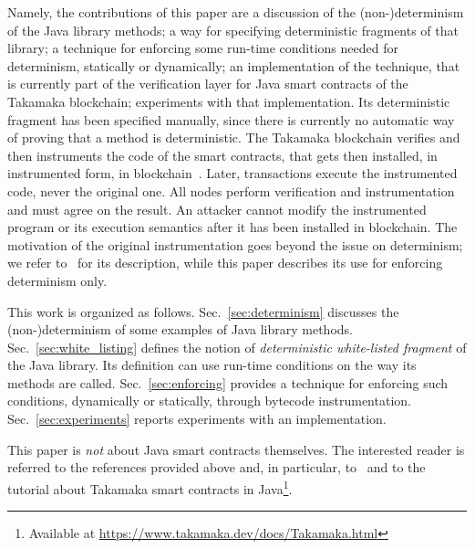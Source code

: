 Namely, the contributions of this paper are a discussion of the (non-)determi\-nism
of the Java library methods; a way for specifying deterministic fragments
of that library; a technique for
enforcing some run-time conditions needed for determinism, statically or dynamically;
an implementation of the technique, that is currently part of the verification
layer for Java smart contracts of the Takamaka blockchain;
experiments with that implementation.
Its deterministic fragment has been specified manually, since there is
currently no automatic way of proving that a method is deterministic.
The Takamaka blockchain verifies and then instruments the code of the smart contracts, that gets
then installed, in instrumented form, in blockchain~\cite{Spoto19}. Later, transactions execute the
instrumented code, never the original one. All nodes perform verification and instrumentation
and must agree on the result. An attacker cannot modify the instrumented program
or its execution semantics after it has been installed in blockchain.
The motivation of the original instrumentation goes beyond the issue on determinism;
we refer to~\cite{Spoto19} for its description, while this paper describes its use for enforcing
determinism only.

This work is organized as follows.
Sec.~\ref{sec:determinism} discusses the (non-)determinism of some
examples of Java library methods.
Sec.~\ref{sec:white_listing} defines the notion of \emph{deterministic white-listed fragment} of the Java library.
Its definition can use run-time conditions on the way its methods are called.
Sec.~\ref{sec:enforcing} provides a technique for enforcing such conditions, dynamically
or statically, through bytecode instrumentation.
Sec.~\ref{sec:experiments} reports experiments with an implementation.

This paper is \emph{not} about Java smart contracts themselves. The interested reader
is referred to the references provided above and, in particular, to~\cite{Spoto19}
and to the tutorial about Takamaka smart contracts in
Java\footnote{Available at \url{https://www.takamaka.dev/docs/Takamaka.html}}.
